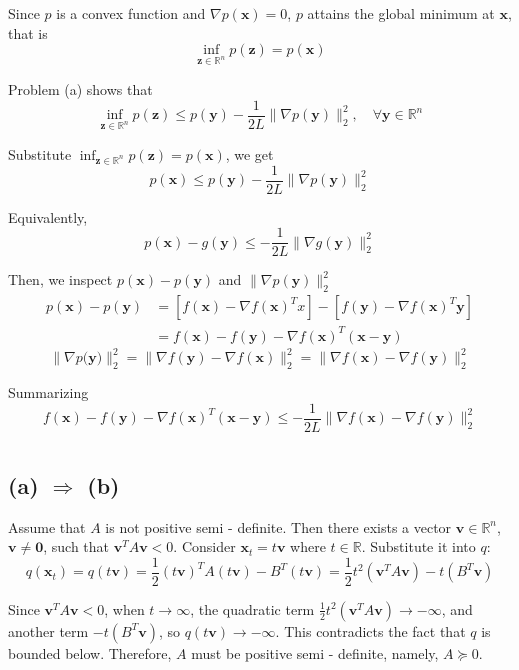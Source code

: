 \documentclass{article}
\begin{document}
 Since $ p $ is a convex function and $ \nabla p(\mathbf{x}) = 0 $, $ p $ attains the global minimum at $ \mathbf{x} $, that is
$$
\inf_{\mathbf{z} \in \mathbb{R}^n}p(\mathbf{z})=p(\mathbf{x})
$$

Problem (a) shows that 
$$
\inf_{\mathbf{z} \in \mathbb{R}^n}p(\mathbf{z})\leq p(\mathbf{y})-\frac{1}{2L}\|\nabla p(\mathbf{y})\|_2^2,\quad \forall \mathbf{y} \in \mathbb{R}^n
$$
	
Substitute $ \inf_{\mathbf{z} \in \mathbb{R}^n}p(\mathbf{z})=p(\mathbf{x}) $, we get
$$
p(\mathbf{x})\leq p(\mathbf{y})-\frac{1}{2L}\|\nabla p(\mathbf{y})\|_2^2
$$

Equivalently,
$$
p(\mathbf{x})-g(\mathbf{y})\leq -\frac{1}{2L}\|\nabla g(\mathbf{y})\|_2^2
$$

Then, we inspect $ p(\mathbf{x}) - p(\mathbf{y}) $ and $ \|\nabla p(\mathbf{y})\|_2^2 $
\begin{align*}
	p(\mathbf{x}) - p(\mathbf{y}) &= \left[ f(\mathbf{x}) - \nabla f(\mathbf{x})^T x \right] - \left[ f(\mathbf{y}) - \nabla f(\mathbf{x})^T \mathbf{y} \right] \\
	&= f(\mathbf{x}) - f(\mathbf{y}) - \nabla f(\mathbf{x})^T (\mathbf{x} - \mathbf{y})
\end{align*}
$$
\|\nabla p\mathbf{(y})\|_2^2 = \|\nabla f(\mathbf{y}) - \nabla f(\mathbf{x})\|_2^2 = \|\nabla f(\mathbf{x}) - \nabla f(\mathbf{y})\|_2^2
$$

Summarizing
$$
{f(\mathbf{x}) - f(\mathbf{y}) - \nabla f(\mathbf{x})^T (\mathbf{x} - \mathbf{y}) \leq -\frac{1}{2L} \|\nabla f(\mathbf{x}) - \nabla f(\mathbf{y})\|_2^2}
$$

\section{}
\subsection*{(a) $\Rightarrow$ (b)}

Assume that $ A $ is not positive semi - definite. Then there exists a vector $ \mathbf{v} \in \mathbb{R}^n $, $ \mathbf{v} \neq \mathbf{0} $, such that $ \mathbf{v}^TA\mathbf{v}< 0 $. Consider $ \mathbf{x}_t = t\mathbf{v} $ where $ t \in \mathbb{R} $. Substitute it into $ q $:
$$
q(\mathbf{x}_t)=q(t\mathbf{v})=\frac{1}{2}(t\mathbf{v})^TA(t\mathbf{v})-B^T(t\mathbf{v})=\frac{1}{2}t^2(\mathbf{v}^TA\mathbf{v})-t(B^T\mathbf{v})
$$

Since $ \mathbf{v}^TA\mathbf{v}< 0 $, when $ t \to \infty $, the quadratic term $ \frac{1}{2}t^2(\mathbf{v}^TA\mathbf{v})\to -\infty $, and another term $ -t(B^T\mathbf{v}) $, so $ q(t\mathbf{v})\to -\infty $. This contradicts the fact that $q$ is bounded below. Therefore, $ A $ must be positive semi - definite, namely, $ A \succeq 0 $.
\end{document}
